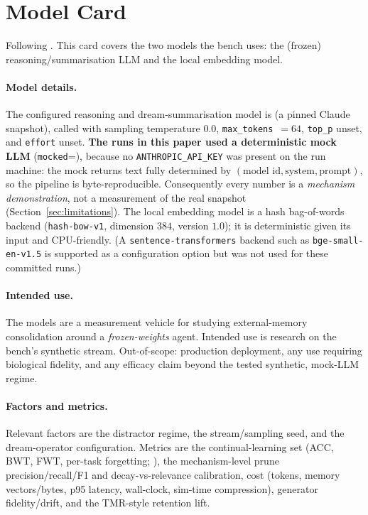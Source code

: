 \section{Model Card}\label{app:modelcard}

Following \citet{mitchell2019modelcards}. This card covers the two models the
bench uses: the (frozen) reasoning/summarisation LLM and the local embedding
model.

\paragraph{Model details.} The configured reasoning and dream-summarisation
model is \texttt{\SWmodelID} (a pinned Claude snapshot), called with sampling
temperature $0.0$, \texttt{max\_tokens}~$=64$, \texttt{top\_p} unset, and
\texttt{effort} unset. \textbf{The runs in this paper used a deterministic mock
LLM} (\texttt{mocked}=\SWmodelMocked), because no \texttt{ANTHROPIC\_API\_KEY}
was present on the run machine: the mock returns text fully determined by
$(\text{model id},\text{system},\text{prompt})$, so the pipeline is
byte-reproducible. Consequently every number is a \emph{mechanism demonstration},
not a measurement of the real snapshot (Section~\ref{sec:limitations}). The
local embedding model is a hash bag-of-words backend (\texttt{hash-bow-v1},
dimension $384$, version $1.0$); it is deterministic given its input and
CPU-friendly. (A \texttt{sentence-transformers} backend such as
\texttt{bge-small-en-v1.5} is supported as a configuration option but was not
used for these committed runs.)

\paragraph{Intended use.} The models are a measurement vehicle for studying
external-memory consolidation around a \emph{frozen-weights} agent. Intended use
is research on the bench's synthetic stream. Out-of-scope: production deployment,
any use requiring biological fidelity, and any efficacy claim beyond the tested
synthetic, mock-LLM regime.

\paragraph{Factors and metrics.} Relevant factors are the distractor regime,
the stream/sampling seed, and the dream-operator configuration. Metrics are the
continual-learning set (ACC, BWT, FWT, per-task forgetting;
\citealp{lopezpaz2017gem,chaudhry2018riemannian}), the mechanism-level prune
precision/recall/F1 and decay-vs-relevance calibration, cost (tokens, memory
vectors/bytes, p95 latency, wall-clock, sim-time compression), generator
fidelity/drift, and the TMR-style retention lift.

